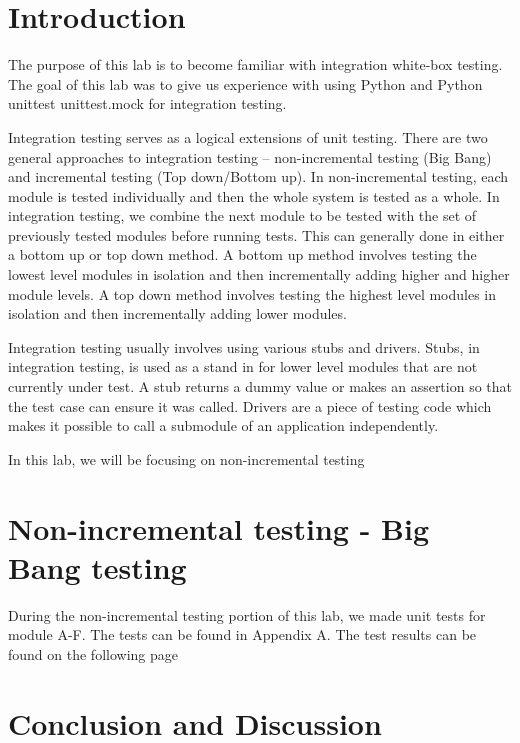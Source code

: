 \documentclass[12pt, letterpaper, titlepage]{article}
\begin{document}
 
\singlespacing

\section{Introduction}
The purpose of this lab is to become familiar with integration white-box testing. The goal of this lab was to give us experience with using Python and Python unittest unittest.mock for integration testing.

Integration testing serves as a logical extensions of unit testing. There are two general approaches to integration testing -- non-incremental testing (Big Bang) and incremental testing (Top down/Bottom up). In non-incremental testing, each module is tested individually and then the whole system is tested as a whole. In integration testing, we combine the next module to be tested with the set of previously tested modules before running tests. This can generally done in either a bottom up or top down method. A bottom up method involves testing the lowest level modules in isolation and then incrementally adding higher and higher module levels. A top down method involves testing the highest level modules in isolation and then incrementally adding lower modules.

Integration testing usually involves using various stubs and drivers. Stubs, in integration testing, is used as a stand in for lower level modules that are not currently under test. A stub returns a dummy value or makes an assertion so that the test case can ensure it was called. Drivers are a piece of testing code which makes it possible to call a submodule of an application independently.

In this lab, we will be focusing on non-incremental testing

\section{Non-incremental testing - Big Bang testing}
During the non-incremental testing portion of this lab, we made unit tests for module A-F. The tests can be found in Appendix A. The test results can be found on the following page

\section{Conclusion and Discussion}
\end{document}
